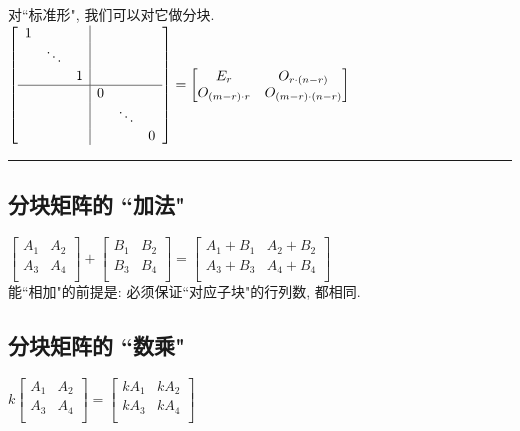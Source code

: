 \documentclass[UTF8]{ctexart}
\begin{document}
对``标准形", 我们可以对它做分块.\\
$
\left[ \begin{array} {ccc|ccc}
	1&		&		&		&		&		\\
	&		\ddots&		&		&		&		\\
	&		&		1&		&		&		\\
	\hline
	&		&		&		0&		&		\\
	&		&		&		&		\ddots&		\\
	&		&		&		&		&		0\\
\end{array} \right] 
=\left[ \begin{matrix}
	E_r&		O_{r\cdot \left( n-r \right)}\\
	O_{\left( m-r \right) \cdot r}&		O_{\left( m-r \right) \cdot \left( n-r \right)}\\
\end{matrix} \right] 
$\\

\hrule

\subsection{分块矩阵的 ``加法"}

$
\left[ \begin{matrix}
	A_1&		A_2\\
	A_3&		A_4\\
\end{matrix} \right] +\left[ \begin{matrix}
	B_1&		B_2\\
	B_3&		B_4\\
\end{matrix} \right] =\left[ \begin{matrix}
	A_1+B_1&		A_2+B_2\\
	A_3+B_3&		A_4+B_4\\
\end{matrix} \right] 
$\\

能``相加"的前提是: 必须保证``对应子块"的行列数, 都相同.




\subsection{分块矩阵的 ``数乘"}

$
k\left[ \begin{matrix}
	A_1&		A_2\\
	A_3&		A_4\\
\end{matrix} \right] =\left[ \begin{matrix}
	kA_1&		kA_2\\
	kA_3&		kA_4\\
\end{matrix} \right] 
$
\end{document}

